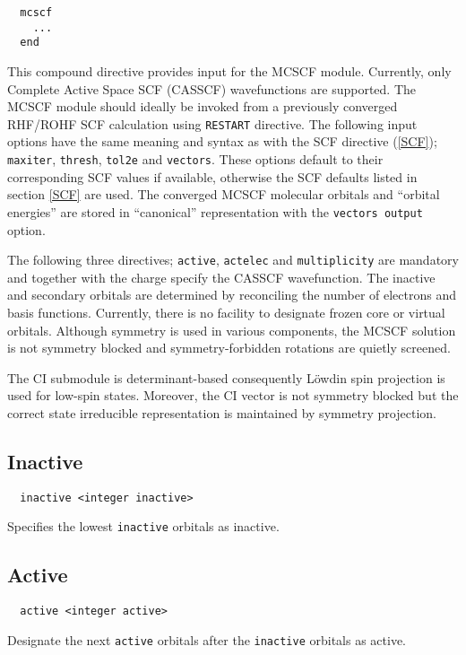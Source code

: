 \label{sec:mcscf}
\begin{verbatim}
  mcscf
    ...
  end
\end{verbatim}

This compound directive provides input for the MCSCF module.
Currently, only Complete Active Space SCF (CASSCF) wavefunctions are
supported. The MCSCF module should ideally be invoked from a previously
converged RHF/ROHF SCF calculation using \verb+RESTART+
directive. The following input options have the same meaning
and syntax as with the SCF directive (\ref{SCF}); \verb+maxiter+,
\verb+thresh+, \verb+tol2e+ and \verb+vectors+.  These options default to
their corresponding SCF values if available, otherwise the SCF defaults
listed in section \ref{SCF} are used. The converged MCSCF molecular
orbitals and ``orbital energies'' are stored in ``canonical''
representation with the \verb+vectors output+ option.

The following three directives; \verb+active+, \verb+actelec+ and
\verb+multiplicity+ are mandatory and together with the charge specify
the CASSCF wavefunction. The inactive and secondary orbitals are
determined by reconciling the number of electrons and basis
functions. Currently, there is no facility to designate frozen core or
virtual orbitals. Although symmetry is used in various components, the
MCSCF solution is not symmetry blocked and symmetry-forbidden
rotations are quietly screened.

The CI submodule is determinant-based consequently L\"owdin spin
projection is used for low-spin states. Moreover, the CI vector is
not symmetry blocked but the correct state irreducible representation
is maintained by symmetry projection.

\subsection{Inactive}
\begin{verbatim}
  inactive <integer inactive>
\end{verbatim}
Specifies the lowest \verb+inactive+ orbitals as inactive.

\subsection{Active}
\begin{verbatim}
  active <integer active>
\end{verbatim}
Designate the next \verb+active+ orbitals after the \verb+inactive+
orbitals as active. 

